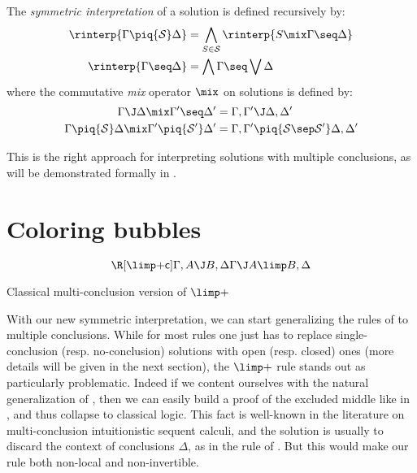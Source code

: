 \begin{definition}
  The \emph{symmetric interpretation} of a solution is defined recursively by:
  \begin{align*}
    \rinterp{\Gamma \piq{\mathcal{S}} \Delta} &=
      \bigwedge_{S \in \mathcal{S}} \rinterp{S \mix \Gamma \seq \Delta} \\
    \rinterp{\Gamma \seq \Delta} &=
      \bigwedge \Gamma \seq \bigvee \Delta
  \end{align*}
  where the commutative \emph{mix} operator $\mix$ on solutions is defined by:
  \begin{align*}
    \Gamma \J \Delta \mix \Gamma' \seq \Delta' &=
      \Gamma, \Gamma' \J \Delta, \Delta' \\
    \Gamma \piq{\mathcal{S}} \Delta \mix \Gamma' \piq{\mathcal{S'}} \Delta' &=
      \Gamma, \Gamma' \piq{\mathcal{S} \sep \mathcal{S'}} \Delta, \Delta' \\
  \end{align*}
\end{definition}

This is the right approach for interpreting solutions with multiple conclusions,
as will be demonstrated formally in .

\section{Coloring bubbles}

\begin{marginfigure}
  $$
  \R[\mathsf{{\limp}{+}c}]
    {\Gamma, A \J B, \Delta}
    {\Gamma \J A \limp B, \Delta}
  $$
  \caption{Classical multi-conclusion version of ${\limp}{+}$}
  \label{wrong-imp-pos}
\end{marginfigure}

With our new symmetric interpretation, we can start generalizing the rules of
 to multiple conclusions. While for most rules one just has to replace
single-conclusion (resp. no-conclusion) solutions with open (resp. closed) ones
(more details will be given in the next section), the ${\limp}{+}$ rule stands
out as particularly problematic. Indeed if we content ourselves with the natural
generalization {} of , then we can
easily build a proof of the excluded middle like in , and thus
collapse to classical logic. This fact is well-known in the literature on
multi-conclusion intuitionistic sequent calculi, and the solution is usually to
discard the context of conclusions $\Delta$, as in the {} rule
of . But this would make our rule both non-local and
non-invertible.

